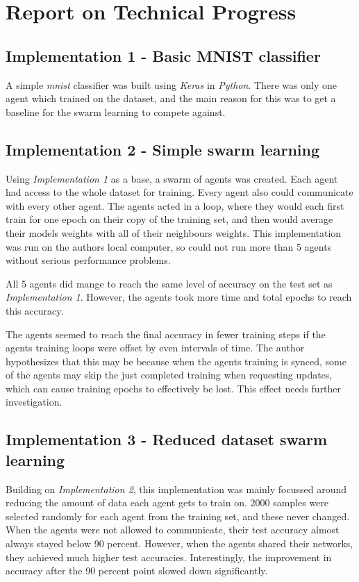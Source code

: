 \chapter{Report on Technical Progress}
\section{Implementation 1 - Basic MNIST classifier}
A simple \emph{mnist} classifier was built using \emph{Keras} in \emph{Python}. There was only one agent which trained on the dataset, and the main reason for this was to get a baseline for the swarm learning to compete against.
\section{Implementation 2 - Simple swarm learning}
Using \emph{Implementation 1} as a base, a swarm of agents was created. Each agent had access to the whole dataset for training. Every agent also could communicate with every other agent. The agents acted in a loop, where they would each first train for one epoch on their copy of the training set, and then would average their models weights with all of their neighbours weights. This implementation was run on the authors local computer, so could not run more than 5 agents without serious performance problems.

All 5 agents did mange to reach the same level of accuracy on the test set as \emph{Implementation 1}. However, the agents took more time and total epochs to reach this accuracy.

The agents seemed to reach the final accuracy in fewer training steps if the agents training loops were offset by even intervals of time. The author hypothesizes that this may be because when the agents training is synced, some of the agents may skip the just completed training when requesting updates, which can cause training epochs to effectively be lost. This effect needs further investigation.
\section{Implementation 3 - Reduced dataset swarm learning}
Building on \emph{Implementation 2}, this implementation was mainly focussed around reducing the amount of data each agent gets to train on. 2000 samples were selected randomly for each agent from the training set, and these never changed. When the agents were not allowed to communicate, their test accuracy almost always stayed below 90 percent. However, when the agents shared their networks, they achieved much higher test accuracies. Interestingly, the improvement in accuracy after the 90 percent point slowed down significantly.